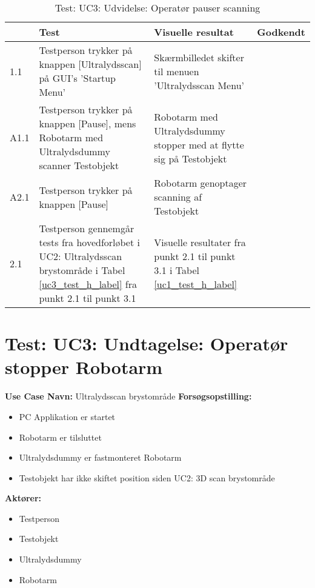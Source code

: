 \begin{table}[htb]
\begin{tabularx}{\textwidth}{|p{0.7cm}|X|X|p{2cm}|}
\hline
\textbf{} & \textbf{Test} & \textbf{Visuelle resultat} &\textbf{Godkendt} \\ \hline
1.1 & Testperson trykker på knappen [Ultralydsscan] på GUI's 'Startup Menu' & Skærmbilledet skifter til menuen 'Ultralydsscan Menu' & \\ \hline
A1.1 & Testperson trykker på knappen [Pause], mens Robotarm med Ultralydsdummy scanner Testobjekt & Robotarm med Ultralydsdummy stopper med at flytte sig på Testobjekt & \\\hline
A2.1 & Testperson trykker på knappen [Pause] & Robotarm genoptager scanning af Testobjekt & \\\hline 
2.1 & Testperson gennemgår tests fra hovedforløbet i UC2: Ultralydsscan brystområde i Tabel \ref{uc3_test_h_label} fra punkt 2.1 til punkt 3.1  & Visuelle resultater fra punkt 2.1 til punkt 3.1 i Tabel \ref{uc1_test_h_label} & \\ \hline
\end{tabularx}
    \caption{Test: UC3: Udvidelse: Operatør pauser scanning} 
    \label{uc3_test_e_1_label}  
\end{table}
\newpage


\section{Test: UC3: Undtagelse: Operatør stopper Robotarm}
\textbf{Use Case Navn:} Ultralydsscan brystområde \newline
\textbf{Forsøgsopstilling:}
\begin{itemize}
\item PC Applikation er startet
\item Robotarm er tilsluttet
\item Ultralydsdummy er fastmonteret Robotarm
\item Testobjekt har ikke skiftet position siden UC2: 3D scan brystområde
\end{itemize}  
\textbf{Aktører:}
\begin{itemize}
\item Testperson
\item Testobjekt
\item Ultralydsdummy
\item Robotarm
\end{itemize}  

